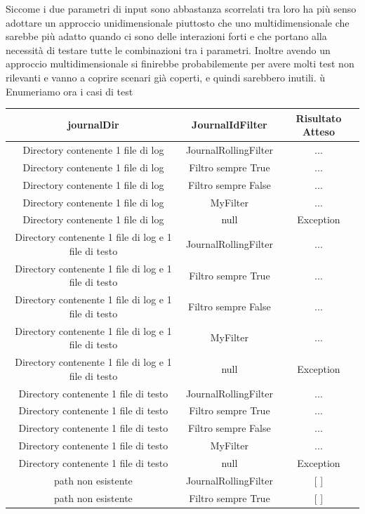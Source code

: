 \documentclass[12pt, a4paper]{article}
\begin{document}
Siccome i due parametri di input sono abbastanza scorrelati tra loro ha più senso adottare un approccio 
unidimensionale piuttosto che uno multidimensionale che sarebbe più adatto quando ci sono delle interazioni forti
e che portano alla necessità di testare tutte le combinazioni tra i parametri. Inoltre avendo un approccio multidimensionale
si finirebbe probabilemente per avere molti test non rilevanti e vanno a coprire scenari già coperti, e quindi sarebbero inutili.
ù
Enumeriamo ora i casi di test

\begin{table}[ht]
\centering
\begin{tabular}{|c|c|c|}
\hline
journalDir & JournalIdFilter & Risultato Atteso \\
\hline
{Directory contenente 1 file di log} & JournalRollingFilter & ... \\
{Directory contenente 1 file di log} & Filtro sempre True & ... \\
{Directory contenente 1 file di log} & Filtro sempre False & ... \\
{Directory contenente 1 file di log} & MyFilter & ... \\
{Directory contenente 1 file di log} & null & Exception \\
{Directory contenente 1 file di log e 1 file di testo} & JournalRollingFilter & ... \\
{Directory contenente 1 file di log e 1 file di testo} & Filtro sempre True & ... \\
{Directory contenente 1 file di log e 1 file di testo} & Filtro sempre False & ... \\
{Directory contenente 1 file di log e 1 file di testo} & MyFilter & ... \\
{Directory contenente 1 file di log e 1 file di testo} & null & Exception \\
{Directory contenente 1 file di testo} & JournalRollingFilter & ... \\
{Directory contenente 1 file di testo} & Filtro sempre True & ... \\
{Directory contenente 1 file di testo} & Filtro sempre False & ... \\
{Directory contenente 1 file di testo} & MyFilter & ... \\
{Directory contenente 1 file di testo} & null & Exception \\
{path non esistente} & JournalRollingFilter & [ ] \\
{path non esistente} & Filtro sempre True & [ ] \\

\end{tabular}
\end{table}
\end{document}
